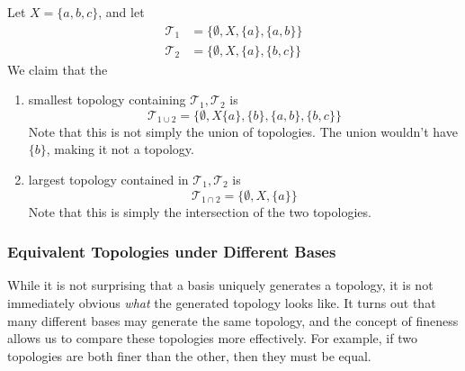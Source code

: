       \begin{example}
        Let $X = \{a, b, c\}$, and let 
        \begin{align}
          \mathscr{T}_1 & = \{\emptyset, X, \{a\}, \{a, b\}\} \\
          \mathscr{T}_2 & = \{\emptyset, X, \{a\}, \{b, c\}\}
        \end{align}
        We claim that the 
        \begin{enumerate}
          \item smallest topology containing $\mathscr{T}_1, \mathscr{T}_2$ is 
          \begin{equation}
            \mathscr{T}_{1 \cup 2} = \{\emptyset, X \{a\}, \{b\}, \{a, b\}, \{b, c\}\}
          \end{equation} 
          Note that this is not simply the union of topologies. The union wouldn't have $\{b\}$, making it not a topology. 

          \item largest topology contained in $\mathscr{T}_1, \mathscr{T}_2$ is 
          \begin{equation}
            \mathscr{T}_{1 \cap 2} = \{\emptyset, X, \{a\}\}
          \end{equation}
          Note that this is simply the intersection of the two topologies. 
        \end{enumerate}
      \end{example}
    
    \subsubsection{Equivalent Topologies under Different Bases} 

      While it is not surprising that a basis uniquely generates a topology, it is not immediately obvious \textit{what} the generated topology looks like. It turns out that many different bases may generate the same topology, and the concept of fineness allows us to compare these topologies more effectively. For example, if two topologies are both finer than the other, then they must be equal. 

